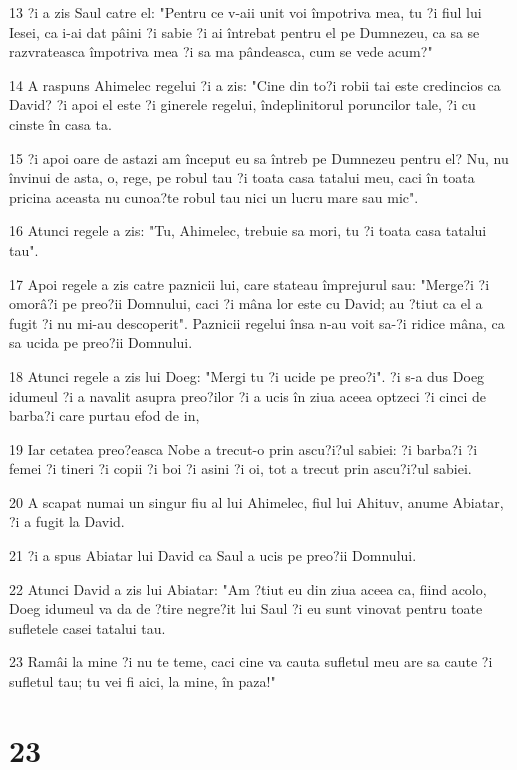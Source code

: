 \par 13 ?i a zis Saul catre el: "Pentru ce v-aii unit voi împotriva mea, tu ?i fiul lui Iesei, ca i-ai dat pâini ?i sabie ?i ai întrebat pentru el pe Dumnezeu, ca sa se razvrateasca împotriva mea ?i sa ma pândeasca, cum se vede acum?"
\par 14 A raspuns Ahimelec regelui ?i a zis: "Cine din to?i robii tai este credincios ca David? ?i apoi el este ?i ginerele regelui, îndeplinitorul poruncilor tale, ?i cu cinste în casa ta.
\par 15 ?i apoi oare de astazi am început eu sa întreb pe Dumnezeu pentru el? Nu, nu învinui de asta, o, rege, pe robul tau ?i toata casa tatalui meu, caci în toata pricina aceasta nu cunoa?te robul tau nici un lucru mare sau mic".
\par 16 Atunci regele a zis: "Tu, Ahimelec, trebuie sa mori, tu ?i toata casa tatalui tau".
\par 17 Apoi regele a zis catre paznicii lui, care stateau împrejurul sau: "Merge?i ?i omorâ?i pe preo?ii Domnului, caci ?i mâna lor este cu David; au ?tiut ca el a fugit ?i nu mi-au descoperit". Paznicii regelui însa n-au voit sa-?i ridice mâna, ca sa ucida pe preo?ii Domnului.
\par 18 Atunci regele a zis lui Doeg: "Mergi tu ?i ucide pe preo?i". ?i s-a dus Doeg idumeul ?i a navalit asupra preo?ilor ?i a ucis în ziua aceea optzeci ?i cinci de barba?i care purtau efod de in,
\par 19 Iar cetatea preo?easca Nobe a trecut-o prin ascu?i?ul sabiei: ?i barba?i ?i femei ?i tineri ?i copii ?i boi ?i asini ?i oi, tot a trecut prin ascu?i?ul sabiei.
\par 20 A scapat numai un singur fiu al lui Ahimelec, fiul lui Ahituv, anume Abiatar, ?i a fugit la David.
\par 21 ?i a spus Abiatar lui David ca Saul a ucis pe preo?ii Domnului.
\par 22 Atunci David a zis lui Abiatar: "Am ?tiut eu din ziua aceea ca, fiind acolo, Doeg idumeul va da de ?tire negre?it lui Saul ?i eu sunt vinovat pentru toate sufletele casei tatalui tau.
\par 23 Ramâi la mine ?i nu te teme, caci cine va cauta sufletul meu are sa caute ?i sufletul tau; tu vei fi aici, la mine, în paza!"

\chapter{23}

